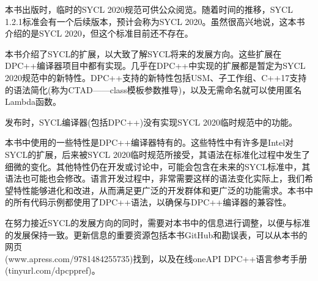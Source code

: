 本书出版时，临时的SYCL 2020规范可供公众阅览。随着时间的推移，SYCL 1.2.1标准会有一个后续版本，预计会称为SYCL 2020。虽然很高兴地说，这本书介绍的是SYCL 2020，但这个标准目前还不存在。\par

本书介绍了SYCL的扩展，以大致了解SYCL将来的发展方向。这些扩展在DPC++编译器项目中都有实现。几乎在DPC++中实现的扩展都是暂定为SYCL 2020规范中的新特性。DPC++支持的新特性包括USM、子工作组、C++17支持的语法简化(称为CTAD——class模板参数推导)，以及无需命名就可以使用匿名Lambda函数。\par

发布时，SYCL编译器(包括DPC++)没有实现SYCL 2020临时规范中的功能。\par

本书中使用的一些特性是DPC++编译器特有的。这些特性中有许多是Intel对SYCL的扩展，后来被SYCL 2020临时规范所接受，其语法在标准化过程中发生了细微的变化。其他特性仍在开发或讨论中，可能会包含在未来的SYCL标准中，其语法也可能也会修改。语言开发过程中，非常需要这样的语法变化实际上，我们希望特性能够进化和改进，从而满足更广泛的开发群体和更广泛的功能需求。本书中的所有代码示例都使用了DPC++语法，以确保与DPC++编译器的兼容性。\par

在努力接近SYCL的发展方向的同时，需要对本书中的信息进行调整，以便与标准的发展保持一致。更新信息的重要资源包括本书GitHub和勘误表，可以从本书的网页\\(www.apress.com/9781484255735)找到，以及在线oneAPI DPC++语言参考手册(tinyurl.com/dpcppref)。\par

















